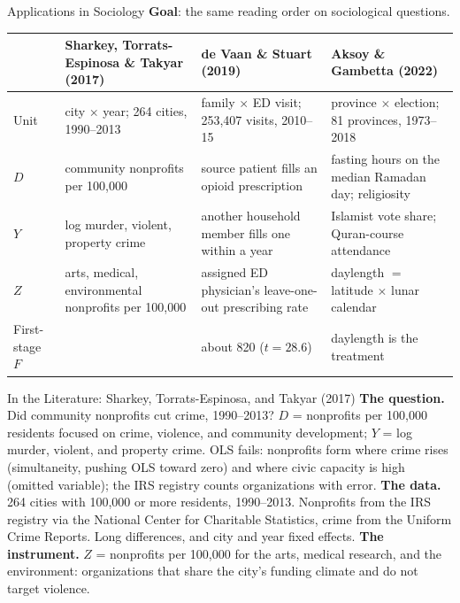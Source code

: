 \documentclass[aspectratio=169,11pt,xcolor=dvipsnames]{beamer}
\begin{document}
\begin{frame}{Applications in Sociology}
\textbf{Goal}: the same reading order on sociological questions.
\vskip1pt
\begin{center}\scriptsize
\renewcommand{\arraystretch}{1.05}
\begin{tabular}{@{}l>{\raggedright\arraybackslash}p{3.3cm}>{\raggedright\arraybackslash}p{3.3cm}>{\raggedright\arraybackslash}p{3.5cm}@{}}
\toprule
 & Sharkey, Torrats-Espinosa \& Takyar (2017) & de Vaan \& Stuart (2019) & Aksoy \& Gambetta (2022) \\
\midrule
Unit & city $\times$ year; 264 cities, 1990--2013 & family $\times$ ED visit; 253,407 visits, 2010--15 & province $\times$ election; 81 provinces, 1973--2018 \\
$D$ & community nonprofits per 100,000 & source patient fills an opioid prescription & fasting hours on the median Ramadan day; religiosity \\
$Y$ & log murder, violent, property crime & another household member fills one within a year & Islamist vote share; Quran-course attendance \\
$Z$ & arts, medical, environmental nonprofits per 100,000 & assigned ED physician's leave-one-out prescribing rate & daylength $=$ latitude $\times$ lunar calendar \\
First-stage $F$ & 112 & about 820 ($t = 28.6$) & daylength is the treatment \\
\bottomrule
\end{tabular}
\end{center}
\end{frame}

\begin{frame}{In the Literature: Sharkey, Torrats-Espinosa, and Takyar (2017)}
\textbf{The question.} Did community nonprofits cut crime, 1990--2013? $D$ =
nonprofits per 100,000 residents focused on crime, violence, and
community development; $Y$ = log murder, violent, and property crime. OLS
fails: nonprofits form where crime rises (simultaneity, pushing OLS toward
zero) and where civic capacity is high (omitted variable); the IRS registry
counts organizations with error.
\vskip3pt
\textbf{The data.} 264 cities with 100,000 or more residents, 1990--2013.
Nonprofits from the IRS registry via the National Center for Charitable
Statistics, crime from the Uniform Crime Reports. Long differences, and
city and year fixed effects.
\vskip3pt
\textbf{The instrument.} $Z$ = nonprofits per 100,000 for the arts, medical
research, and the environment: organizations that share the city's funding
climate and do not target violence.
\end{frame}
\end{document}
